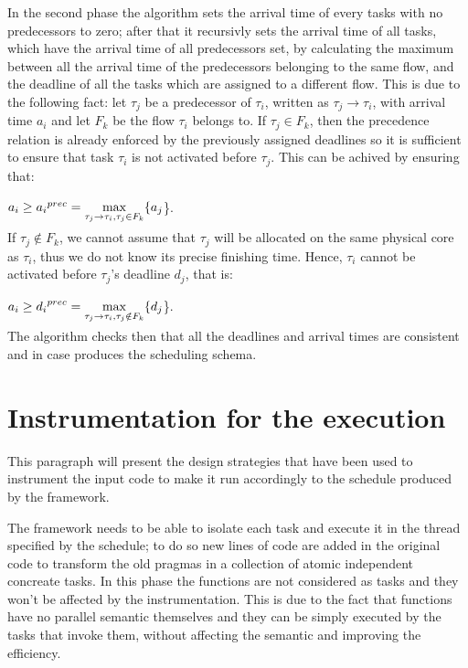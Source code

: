 \documentclass[a4paper,12pt,oneside]{book}
\begin{document}
In the second phase the algorithm sets the arrival time of every tasks with no predecessors to zero; after that it recursivly sets the arrival time of all tasks, which have the arrival time of all predecessors set, by calculating the maximum between all the arrival time of the predecessors belonging to the same flow, and the deadline of all the tasks which are assigned to a different flow. This is due to the following fact: let $\tau_j$ be a predecessor of $\tau_i$, written as $\tau_j \rightarrow \tau_i$, with arrival time $a_i$ and let $F_k$ be the flow $\tau_i$ belongs to. If $\tau_j \in F_k$, then the precedence relation is already enforced by the previously assigned deadlines so it is sufficient to ensure that task $\tau_i$ is not activated before $\tau_j$. This can be achived by ensuring that:
\begin{center}$ a_i \ge  {a_i}^{prec} = \smash{\displaystyle\max_{\tau_j \rightarrow \tau_i,\tau_j \in F_k} }\{a_j$\}.\end{center}
If $\tau_j \notin F_k$, we cannot assume that $\tau_j$ will be allocated on the same physical core as $\tau_i$, thus we do not know its precise finishing time. Hence, $\tau_i$ cannot be activated before $\tau_j$'s deadline $d_j$, that is:
\begin{center}$ a_i \ge  {d_i}^{prec} = \smash{\displaystyle\max_{\tau_j \rightarrow \tau_i,\tau_j \notin F_k} }\{d_j$\}.\end{center}
The algorithm checks then that all the deadlines and arrival times are consistent and in case produces the scheduling schema.

\section{Instrumentation for the execution}
\label{designexecution}

This paragraph will present the design strategies that have been used to instrument the input code to make it run accordingly to the schedule produced by the framework. 

The framework needs to be able to isolate each task and execute it in the thread specified by the schedule; to do so new lines of code are added in the original code to transform the old pragmas in a collection of atomic independent concreate tasks. In this phase the functions are not considered as tasks and they won’t be affected by the instrumentation. This is due to the fact that functions have no parallel semantic themselves and they can be simply executed by the tasks that invoke them, without affecting the semantic and improving the efficiency.
\end{document}
